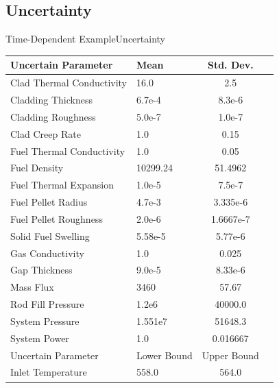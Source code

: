 \documentclass{beamer}
\begin{document}
\subsection{Uncertainty}
\begin{frame}{Time-Dependent Example}{Uncertainty}\vspace{-20pt}
\begin{table}
  \scriptsize
  \centering
  \begin{tabular}{l l|c c}\hline
    Uncertain Parameter & Mean & Std. Dev. \\ \hline
 Clad Thermal Conductivity & 16.0     &     2.5 \\
 Cladding Thickness        & 6.7e-4   &     8.3e-6 \\
 Cladding Roughness        & 5.0e-7   &     1.0e-7 \\
 Clad Creep Rate           & 1.0      &     0.15 \\
 Fuel Thermal Conductivity & 1.0      &     0.05 \\
 Fuel Density              & 10299.24 &    51.4962 \\
 Fuel Thermal Expansion    & 1.0e-5   &     7.5e-7 \\
 Fuel Pellet Radius        & 4.7e-3   &     3.335e-6 \\
 Fuel Pellet Roughness     & 2.0e-6   &     1.6667e-7 \\
 Solid Fuel Swelling       & 5.58e-5  &     5.77e-6 \\
 Gas Conductivity          & 1.0      &     0.025 \\
 Gap Thickness             & 9.0e-5   &     8.33e-6 \\
 Mass Flux                 & 3460     &    57.67 \\
 Rod Fill Pressure         & 1.2e6    & 40000.0 \\
 System Pressure           & 1.551e7  & 51648.3 \\
 System Power              & 1.0      &     0.016667 \\ \hline
 Uncertain Parameter & Lower Bound & Upper Bound \\ \hline
 Inlet Temperature         & 558.0    & 564.0
  \end{tabular}
\end{table}
\end{frame}
\end{document}
